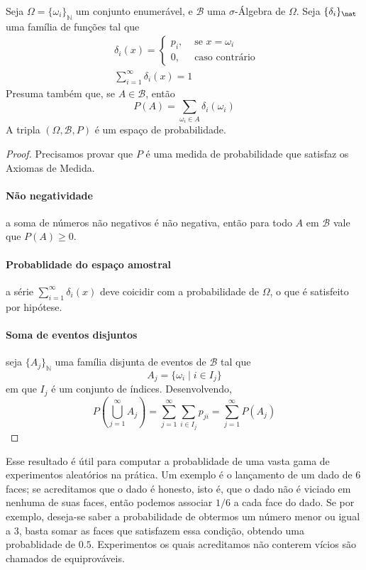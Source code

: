 \begin{thm:soma prob}
\label{thm:soma prob}
Seja $\Omega = \{\omega_i\}_{\mathbb{N}}$ um conjunto enumerável, e $\mathcal{B}$ uma
$\sigma$-Álgebra de $\Omega$.
Seja $\{\delta_i\}_\nat$ uma família de funções tal que
\begin{align*}
	 & \delta_i(x) = \begin{cases}
		                 p_i, & \text{ se }  x = \omega_i \\
		                 0,   & \text{ caso contrário }
	                 \end{cases} \\
	 & \sum_{i=1}^\infty \delta_i(x) = 1
\end{align*}
Presuma também que, se $A \in \mathcal{B}$, então
\[
	P(A) = \sum_{\omega_i \in A} \delta_i(\omega_i)
\]
A tripla $(\Omega, \mathcal{B}, P)$ é um espaço de probabilidade.
\begin{proof}
	Precisamos provar que $P$ é uma medida de probabilidade que satisfaz os Axiomas de
	Medida.

	\paragraph{Não negatividade} a soma de números não negativos é não negativa, então
	para todo $A$ em $\mathcal{B}$ vale que $P(A) \geq 0$.

	\paragraph{Probablidade do espaço amostral} a série $\sum_{i=1}^\infty \delta_i(x)$
	deve coicidir com a probabilidade de $\Omega$, o que é satisfeito por hipótese.

	\paragraph{Soma de eventos disjuntos} seja $\{A_j\}_{\mathbb{N}}$ uma família
	disjunta de eventos de $\mathcal{B}$ tal que
	\[
		A_j = \{\omega_i \mid i \in I_j\}
	\]
	em que $I_j$ é um conjunto de índices. Desenvolvendo,
	\[
		P\left(\bigcup_{j=1}^\infty A_j\right) = \sum_{j=1}^\infty \sum_{i \in I_j} p_{ji}
		= \sum_{j=1}^\infty P(A_j)
	\]
\end{proof}
\end{thm:soma prob}

Esse resultado é útil para computar a probablidade de uma vasta gama de
experimentos aleatórios na prática. Um exemplo é o lançamento de um dado de 6
faces; se acreditamos que o dado é honesto, isto é, que o dado não é viciado em
nenhuma de suas faces, então podemos associar $1/6$ a cada face do dado. Se por
exemplo, deseja-se saber a probabilidade de obtermos um número menor ou igual a
3, basta somar as faces que satisfazem essa condição, obtendo uma probablidade
de $0.5$.
Experimentos os quais acreditamos não conterem vícios são chamados de equiprováveis.

